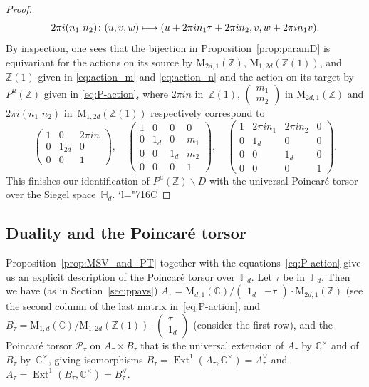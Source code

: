 \documentclass[11pt]{article}
\providecommand{\C}{}
\let\mathcal\mathscr
\newcommand{\Changelback}{\mathcode`l="716C}
\def\mto{\mathchoice{\longmapsto}{\mapsto}{\mapsto}{\mapsto}}
\let\oldvee\vee
\renewcommand{\vee}{{\scriptscriptstyle\oldvee}}
\theoremstyle{plain}
\theoremstyle{definition}
\numberwithin{equation}{subsection}
\renewcommand{\C}{\mathbb C}
\newcommand{\Z}{\mathbb Z}
\renewcommand{\H}{\mathbb H}
\newcommand{\calP}{\mathcal{P}}
\newcommand{\rmM}{\mathrm{M}}
\DeclareMathOperator{\Ext}{Ext}
\begin{document}
\begin{proof}
\begin{equation}
\label{eq:action_n}
2\pi i(n_1\,\, n_2)\colon (u,v,w)\mto
(u+2\pi i n_1\tau+2\pi i n_2, v, w+2\pi i n_1v).
\end{equation}
By inspection, one sees that the bijection in
Proposition~\ref{prop:paramD} is equivariant for the actions on its
source by $\rmM_{2d,1}(\Z)$, $\rmM_{1,2d}(\Z(1))$, and~$\Z(1)$ given
in \eqref{eq:action_m} and \eqref{eq:action_n} and the action on its
target by $P^u(\Z)$ given in \eqref{eq:P-action}, where $2\pi i n$
in~$\Z(1)$, $(\substack{m_1\\m_2})$ in $\rmM_{2d,1}(\Z)$ and $2\pi
i(n_1\,\, n_2)$ in~$\rmM_{1,2d}(\Z(1))$ respectively correspond to
\begin{equation}\label{eq:equiv-actions}
\begin{pmatrix}
1 & 0 & 2\pi in\\
0 & 1_{2d} & 0\\
0 & 0 & 1
\end{pmatrix},\quad
\begin{pmatrix}
1 & 0 & 0 & 0\\
0 & 1_d & 0 & m_1\\
0 & 0 & 1_d & m_2\\
0 & 0 & 0 & 1
\end{pmatrix},\quad
\begin{pmatrix}
1 & 2\pi in_1 & 2\pi in_2 & 0\\
0 & 1_d & 0 & 0\\
0 & 0 & 1_d & 0\\
0 & 0 & 0 & 1
\end{pmatrix}.
\end{equation}
This finishes our identification of $P^u(\Z)\backslash D$ with the
universal Poincaré torsor over the Siegel space~$\H_d$.
\Changelback
\end{proof}


\subsection{Duality and the Poincaré torsor}\label{sec4.7}
Proposition~\ref{prop:MSV_and_PT} together with the
equations~\eqref{eq:P-action} give us an explicit description of the
Poincaré torsor over~$\H_d$. Let $\tau$ be in~$\H_d$. Then we have
(as in Section~\ref{sec:ppavs})
$A_\tau=\rmM_{d,1}(\C)/ (\begin{matrix} 1_d &
-\tau\end{matrix}){\cdot}\rmM_{2d,1}(\Z)$ (see the second column of the
last matrix in~\eqref{eq:P-action}, and
$B_\tau=\rmM_{1,d}(\C)/\rmM_{1,2d}(\Z(1)){\cdot}(\substack{\tau\\1_d})$
(consider the first row), and the Poincaré torsor $\calP_\tau$ on
$A_\tau\times B_\tau$ that is the universal extension of $A_\tau$ by
$\C^\times$ and of $B_\tau$ by~$\C^\times$, giving isomorphisms
$B_\tau=\Ext^1(A_\tau,\C^\times)=A_\tau^\vee$ and
$A_\tau=\Ext^1(B_\tau,\C^\times)=B_\tau^\vee$.
\end{document}
